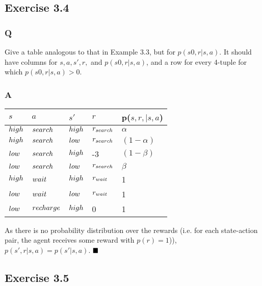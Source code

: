 \subsection{Exercise 3.4}
\subsubsection*{Q}
Give a table analogous to that in Example 3.3, but for \(p(s0, r|s, a)\). It should have columns for \(s, a, s', r,\) and \(p(s0, r|s, a)\), and a row for every 4-tuple for which \(p(s0, r|s, a) > 0\).

\subsubsection*{A}
\begin{table}[]
	\begin{tabular}{llll|l}
\(s\) & \(a\) & \(s'\) & \(r\) & p(\(s, r, | s, a\)) \\ \hline 
$\mathnormal{high}$		& $ \mathnormal{search}$     & $\mathnormal{high} $       & \(r_{\mathnormal{search}}\)       &   \(\alpha\) \\
$\mathnormal{high}$		&  $\mathnormal{search}$     &  $\mathnormal{low}$      &   \(r_{\mathnormal{search}}\)     &  \((1-\alpha)\) \\                  
$\mathnormal{low}$		&  $\mathnormal{search}$     & $\mathnormal{high}$       & -3      & \((1-\beta)\)                    \\
$\mathnormal{low}$		&  $\mathnormal{search}$    & $\mathnormal{low} $       &  \(r_{\mathnormal{search}}\)      & \(\beta\) \\                     
$\mathnormal{high}$		&  $\mathnormal{wait}$     & $\mathnormal{high}$       & \(r_{\mathnormal{wait}}\)       &   1   \\
$\mathnormal{low}$		&  $\mathnormal{wait}$   & $\mathnormal{low}$       &  \(r_{\mathnormal{wait}}\)      &  1  \\
$\mathnormal{low}$		&  $\mathnormal{recharge}$   & $\mathnormal{high}$       &  0      &   1       \\
	\end{tabular}
\end{table}

As there is no probability distribution over the rewards (i.e. for each state-action pair, the agent receives some reward with \(p(r) = 1\))), \(p(s', r | s, a) = p(s' | s, a)\).
$
\hfill \blacksquare
$

\subsection{Exercise 3.5}
